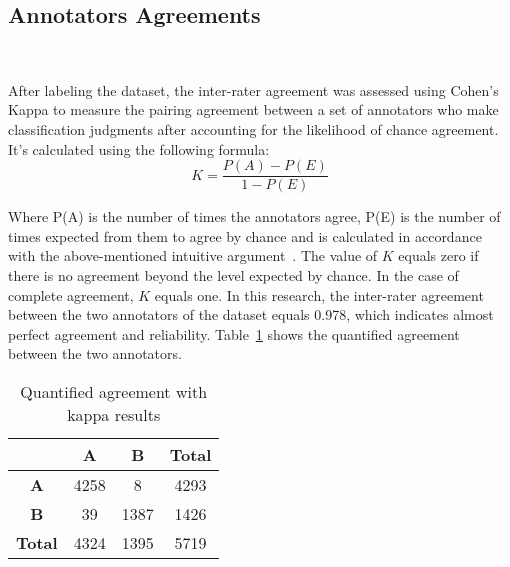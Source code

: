 \documentclass[sn-mathphys,Numbered]{sn-jnl}%
\begin{document}
\subsection{Annotators Agreements}
~\label{subSec:kappa} 

    
After labeling the dataset, the inter-rater agreement was assessed using Cohen’s Kappa to measure the pairing agreement between a set of annotators who make classification judgments after accounting for the likelihood of chance agreement. It’s calculated using the following formula:
\begin{equation}
K = \frac{P(A) -  P(E)}{1 - P(E) }%
\end{equation}



Where P(A) is the number of times the annotators agree, P(E) is the number of times expected from them to agree by chance and is calculated in accordance with the above-mentioned intuitive argument~\cite{kappasidney1957nonparametric}. The value of $K$ equals zero if there is no agreement beyond the level expected by chance. In the case of complete agreement, $K$ equals one. In this research, the inter-rater agreement between the two annotators of the dataset equals 0.978, which indicates almost perfect agreement and reliability. Table~\ref{kappaT} shows the quantified agreement between the two annotators.    %


\begin{table}[htp!]
\centering


\begin{tabular}{|c|c|c|c|}
\hline
       & \textbf{A}  & \textbf{B} &\textbf{Total}         \\ \hline
\textbf{A}  & 4258 & 8 & 4293 \\ \hline
\textbf{B}  & 39 & 1387 & 1426 \\ \hline
\textbf{Total} & 4324 & 1395 & 5719\\ \hline
\end{tabular}
\caption{\label{kappaT} Quantified agreement with kappa results}
\end{table}

\end{document}
